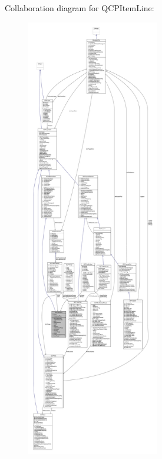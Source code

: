 Collaboration diagram for Q\+C\+P\+Item\+Line\+:\nopagebreak
\begin{figure}[H]
\begin{center}
\leavevmode
\includegraphics[height=550pt]{class_q_c_p_item_line__coll__graph}
\end{center}
\end{figure}
